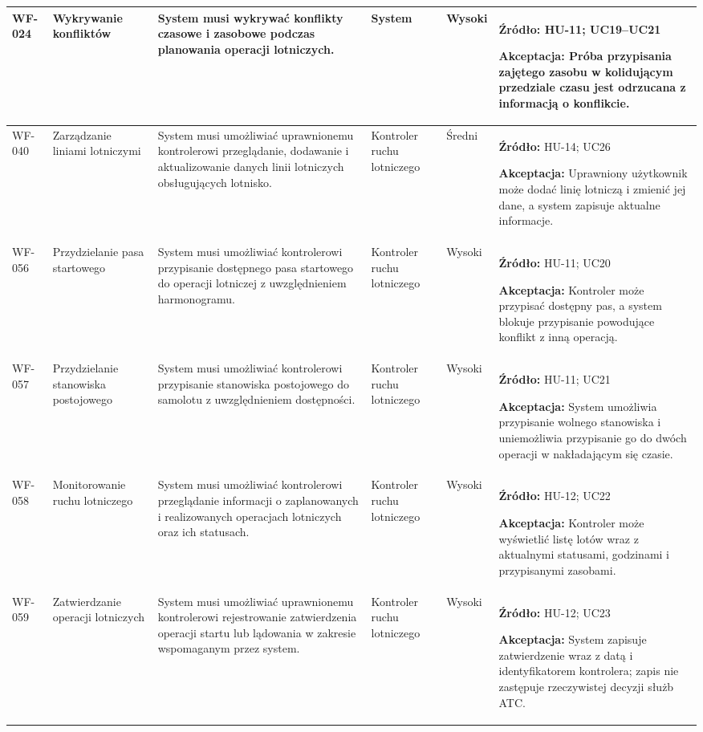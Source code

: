 \documentclass[12pt,a4paper,oneside]{report}
\begin{document}
\begin{longtable}{|p{1.05cm}|p{2.15cm}|p{3.35cm}|p{1.75cm}|p{0.95cm}|p{4.05cm}|}
WF-024 & Wykrywanie konfliktów & System musi wykrywać konflikty czasowe i zasobowe podczas planowania operacji lotniczych. & System & Wysoki & \textbf{Źródło:} HU-11; UC19–UC21\par\textbf{Akceptacja:} Próba przypisania zajętego zasobu w kolidującym przedziale czasu jest odrzucana z informacją o konflikcie.\\\hline
WF-040 & Zarządzanie liniami lotniczymi & System musi umożliwiać uprawnionemu kontrolerowi przeglądanie, dodawanie i aktualizowanie danych linii lotniczych obsługujących lotnisko. & Kontroler ruchu lotniczego & Średni & \textbf{Źródło:} HU-14; UC26\par\textbf{Akceptacja:} Uprawniony użytkownik może dodać linię lotniczą i zmienić jej dane, a system zapisuje aktualne informacje.\\\hline
WF-056 & Przydzielanie pasa startowego & System musi umożliwiać kontrolerowi przypisanie dostępnego pasa startowego do operacji lotniczej z uwzględnieniem harmonogramu. & Kontroler ruchu lotniczego & Wysoki & \textbf{Źródło:} HU-11; UC20\par\textbf{Akceptacja:} Kontroler może przypisać dostępny pas, a system blokuje przypisanie powodujące konflikt z inną operacją.\\\hline
WF-057 & Przydzielanie stanowiska postojowego & System musi umożliwiać kontrolerowi przypisanie stanowiska postojowego do samolotu z uwzględnieniem dostępności. & Kontroler ruchu lotniczego & Wysoki & \textbf{Źródło:} HU-11; UC21\par\textbf{Akceptacja:} System umożliwia przypisanie wolnego stanowiska i uniemożliwia przypisanie go do dwóch operacji w nakładającym się czasie.\\\hline
WF-058 & Monitorowanie ruchu lotniczego & System musi umożliwiać kontrolerowi przeglądanie informacji o zaplanowanych i realizowanych operacjach lotniczych oraz ich statusach. & Kontroler ruchu lotniczego & Wysoki & \textbf{Źródło:} HU-12; UC22\par\textbf{Akceptacja:} Kontroler może wyświetlić listę lotów wraz z aktualnymi statusami, godzinami i przypisanymi zasobami.\\\hline
WF-059 & Zatwierdzanie operacji lotniczych & System musi umożliwiać uprawnionemu kontrolerowi rejestrowanie zatwierdzenia operacji startu lub lądowania w zakresie wspomaganym przez system. & Kontroler ruchu lotniczego & Wysoki & \textbf{Źródło:} HU-12; UC23\par\textbf{Akceptacja:} System zapisuje zatwierdzenie wraz z datą i identyfikatorem kontrolera; zapis nie zastępuje rzeczywistej decyzji służb ATC.\\\hline
\end{longtable}
\normalsize
\end{document}

